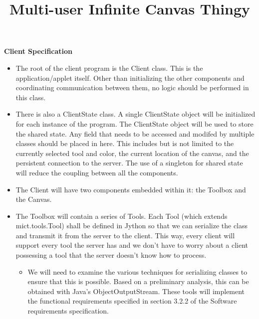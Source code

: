\documentclass[12pt]{article}
\title{Multi-user Infinite Canvas Thingy}
\begin{document}
 \maketitle
 \textbf{Client Specification}
 \begin{itemize}
 \item
    The root of the client program is the Client class. This is the application/applet itself. Other than initializing the other components and coordinating communication between them, no logic should be performed in this class.
 \item
     There is also a ClientState class. A single ClientState object will be initialized for each instance of the program. The ClientState object will be used to store the shared state. Any field that needs to be accessed and modifed by multiple classes should be placed in here. This includes but is not limited to the currently selected tool and color, the current location of the canvas, and the persistent connection to the server. The use of a singleton for shared state will reduce the coupling between all the components.
 \item
 The Client will have two components embedded within it: the Toolbox and the Canvas.
 \item
  The Toolbox will contain a series of Tools. Each Tool (which extends mict.tools.Tool) shall be defined in Jython so that we can serialize the class and transmit it from the server to the client. This way, every client will support every tool the server has and we don't have to worry about a client possessing a tool that the server doesn't know how to process.
  \begin{itemize}
  \item
  We will need to examine the various techniques for serializing classes to
  ensure that this is possible. Based on a preliminary analysis, this can be
  obtained with Java’s ObjectOutputStream. These tools
  will implement the functional requirements specified in section 3.2.2 of the
  Software requirements specification.


\end{itemize}
\end{itemize}
\end{document}
